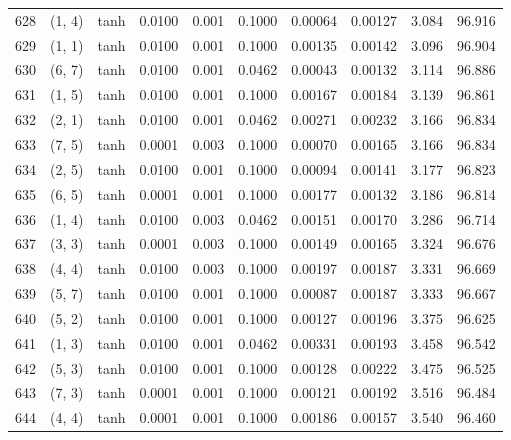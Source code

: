 \begin{tabular}{lllrrrrrrr}
628 &      (1, 4) &      tanh &  0.0100 &  0.001 &  0.1000 &          0.00064 &    0.00127 &       3.084 &    96.916 \\
629 &      (1, 1) &      tanh &  0.0100 &  0.001 &  0.1000 &          0.00135 &    0.00142 &       3.096 &    96.904 \\
630 &      (6, 7) &      tanh &  0.0100 &  0.001 &  0.0462 &          0.00043 &    0.00132 &       3.114 &    96.886 \\
631 &      (1, 5) &      tanh &  0.0100 &  0.001 &  0.1000 &          0.00167 &    0.00184 &       3.139 &    96.861 \\
632 &      (2, 1) &      tanh &  0.0100 &  0.001 &  0.0462 &          0.00271 &    0.00232 &       3.166 &    96.834 \\
633 &      (7, 5) &      tanh &  0.0001 &  0.003 &  0.1000 &          0.00070 &    0.00165 &       3.166 &    96.834 \\
634 &      (2, 5) &      tanh &  0.0100 &  0.001 &  0.1000 &          0.00094 &    0.00141 &       3.177 &    96.823 \\
635 &      (6, 5) &      tanh &  0.0001 &  0.001 &  0.1000 &          0.00177 &    0.00132 &       3.186 &    96.814 \\
636 &      (1, 4) &      tanh &  0.0100 &  0.003 &  0.0462 &          0.00151 &    0.00170 &       3.286 &    96.714 \\
637 &      (3, 3) &      tanh &  0.0001 &  0.003 &  0.1000 &          0.00149 &    0.00165 &       3.324 &    96.676 \\
638 &      (4, 4) &      tanh &  0.0100 &  0.003 &  0.1000 &          0.00197 &    0.00187 &       3.331 &    96.669 \\
639 &      (5, 7) &      tanh &  0.0100 &  0.001 &  0.1000 &          0.00087 &    0.00187 &       3.333 &    96.667 \\
640 &      (5, 2) &      tanh &  0.0100 &  0.001 &  0.1000 &          0.00127 &    0.00196 &       3.375 &    96.625 \\
641 &      (1, 3) &      tanh &  0.0100 &  0.001 &  0.0462 &          0.00331 &    0.00193 &       3.458 &    96.542 \\
642 &      (5, 3) &      tanh &  0.0100 &  0.001 &  0.1000 &          0.00128 &    0.00222 &       3.475 &    96.525 \\
643 &      (7, 3) &      tanh &  0.0001 &  0.001 &  0.1000 &          0.00121 &    0.00192 &       3.516 &    96.484 \\
644 &      (4, 4) &      tanh &  0.0001 &  0.001 &  0.1000 &          0.00186 &    0.00157 &       3.540 &    96.460 \\

\end{tabular}
